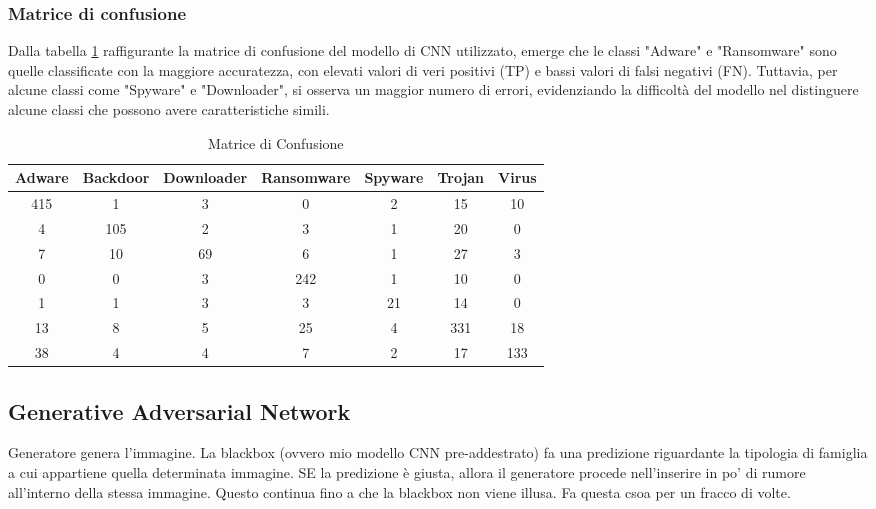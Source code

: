 \subsubsection{Matrice di confusione}
Dalla tabella \ref{tab:confusion_matrix} raffigurante la matrice di confusione del modello di CNN utilizzato, emerge che le classi "Adware" e "Ransomware" sono quelle classificate con la maggiore accuratezza, con elevati valori di veri positivi (TP) e bassi valori di falsi negativi (FN). Tuttavia, per alcune classi come "Spyware" e "Downloader", si osserva un maggior numero di errori, evidenziando la difficoltà del modello nel distinguere alcune classi che possono avere caratteristiche simili.
\begin{table}[h]
    \centering
    \begin{tabular}{|c|c|c|c|c|c|c|}
    \hline
    \textbf{Adware} & \textbf{Backdoor} & \textbf{Downloader} & \textbf{Ransomware} & \textbf{Spyware} & \textbf{Trojan} & \textbf{Virus} \\
    \hline
    415 & 1  & 3  & 0  & 2  & 15 & 10 \\
    \hline
    4   & 105 & 2  & 3  & 1  & 20 & 0  \\
    \hline
    7   & 10  & 69 & 6  & 1  & 27 & 3  \\
    \hline
    0   & 0   & 3  & 242 & 1  & 10 & 0  \\
    \hline
    1   & 1   & 3  & 3   & 21 & 14 & 0  \\
    \hline
    13  & 8   & 5  & 25  & 4  & 331 & 18 \\
    \hline
    38  & 4   & 4  & 7   & 2  & 17 & 133 \\
    \hline
    \end{tabular}
    \caption{Matrice di Confusione}
    \label{tab:confusion_matrix}
\end{table}
    
\newpage
\subsection{Generative Adversarial Network}
Generatore genera l'immagine. La blackbox (ovvero mio modello CNN pre-addestrato) fa una predizione riguardante la tipologia di famiglia a cui appartiene quella determinata immagine. SE la predizione è giusta, allora il generatore procede nell'inserire in po' di rumore all'interno della stessa immagine. Questo continua fino a che la blackbox non viene illusa. Fa questa csoa per un fracco di volte.
